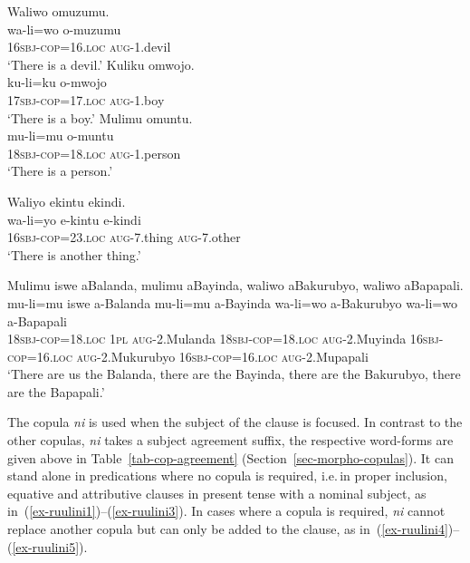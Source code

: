 \ea \label{ex-ruuliexistential}
\begin{xlist}
\ex \label{ex-ruuli16.loc}
	\glll Waliwo omuzumu.\\
		  wa-li=wo o-muzumu\\
		1\textsc{6sbj}-\textsc{cop}=16.\textsc{loc} \textsc{aug}-1.devil\\
	\glt ‘There is a devil.’ 
\ex \label{ex-ruuli17.loc}
	\glll Kuliku omwojo.\\
	  ku-li=ku o-mwojo\\
		1\textsc{7sbj}-\textsc{cop}=17.\textsc{loc} \textsc{aug}-1.boy\\
	\glt ‘There is a boy.’ 	
\ex \label{ex-ruuli18.loc}
	\glll Mulimu omuntu. \\
	 mu-li=mu o-muntu\\
		1\textsc{8sbj}-\textsc{cop}=18.\textsc{loc} \textsc{aug}-1.person\\
	\glt ‘There is a person.’	

\ex \label{ex-ruuli16.23}
	\glll Waliyo ekintu ekindi. \\
	wa-li=yo e-kintu e-kindi\\
		1\textsc{6sbj}-\textsc{cop}=23.\textsc{loc} \textsc{aug}-7.thing \textsc{aug}-7.other\\
	\glt ‘There is another thing.’ 
	
\ex\label{ex-ruulimanyloc}
  \glll Mulimu iswe aBalanda, mulimu { } aBayinda, waliwo aBakurubyo, { } { } { } { } waliwo aBapapali.\\
   mu-li=mu iswe a-Balanda mu-li=mu { }  a-Bayinda wa-li=wo a-Bakurubyo { } { } { } { } wa-li=wo a-Bapapali\\
	1\textsc{8sbj}-\textsc{cop}=18.\textsc{loc} 1\textsc{pl} \textsc{aug}-2.Mulanda 1\textsc{8sbj}-\textsc{cop}=18.\textsc{loc} { } \textsc{aug}-2.Muyinda 1\textsc{6sbj}-\textsc{cop}=16.\textsc{loc} \textsc{aug}-2.Mukurubyo { } { } { } { }  \textsc{16sbj}-\textsc{cop}=16.\textsc{loc} \textsc{aug}-2.Mupapali\\
\glt `There are us the Balanda, there are the Bayinda, there are the Bakurubyo, there are the Bapapali.'
	
\end{xlist}
\z

The copula \textit{ni} is used when the subject of the clause is focused. 
In contrast to the other copulas, \textit{ni} takes a subject agreement suffix, the respective word-forms are given above in Table~\ref{tab-cop-agreement} (Section~\ref{sec-morpho-copulas}). 
It can stand alone in predications where no copula is required, i.e.\,in proper inclusion, equative and attributive clauses in present tense with a nominal subject, as in~(\ref{ex-ruulini1})--(\ref{ex-ruulini3}). 
In cases where a copula is required, \textit{ni} cannot replace another copula but can only be added to the clause, as in~(\ref{ex-ruulini4})--(\ref{ex-ruulini5}).

